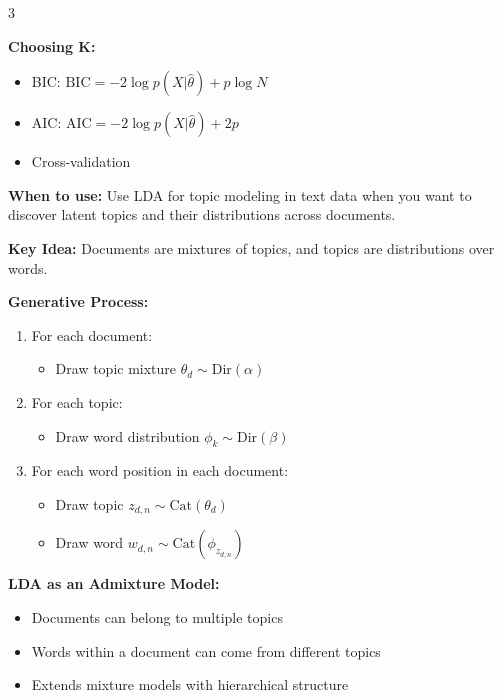 \documentclass[10pt,landscape]{article}
\begin{document}
\begin{multicols}{3}
\begin{tcolorbox}[breakable, title=6.2 Gaussian Mixture Models (GMM), colback=mixture,boxsep=1pt,left=1pt,right=1pt,top=1pt,bottom=1pt]
\textbf{Choosing K:}
\begin{itemize}[leftmargin=*,noitemsep,topsep=0pt]
    \item BIC: $\text{BIC} = -2\log p(X|\hat{\theta}) + p\log N$
    \item AIC: $\text{AIC} = -2\log p(X|\hat{\theta}) + 2p$
    \item Cross-validation
\end{itemize}
\end{tcolorbox}

\begin{tcolorbox}[breakable, title=6.3 Latent Dirichlet Allocation (LDA), colback=mixture,boxsep=1pt,left=1pt,right=1pt,top=1pt,bottom=1pt]
\textbf{When to use:} Use LDA for topic modeling in text data when you want to discover latent topics and their distributions across documents.

\textbf{Key Idea:} Documents are mixtures of topics, and topics are distributions over words.

\textbf{Generative Process:}
\begin{enumerate}[leftmargin=*,noitemsep,topsep=0pt]
    \item For each document:
    \begin{itemize}[leftmargin=*,noitemsep]
        \item Draw topic mixture $\theta_d \sim \text{Dir}(\alpha)$
    \end{itemize}
    \item For each topic:
    \begin{itemize}[leftmargin=*,noitemsep]
        \item Draw word distribution $\phi_k \sim \text{Dir}(\beta)$
    \end{itemize}
    \item For each word position in each document:
    \begin{itemize}[leftmargin=*,noitemsep]
        \item Draw topic $z_{d,n} \sim \text{Cat}(\theta_d)$
        \item Draw word $w_{d,n} \sim \text{Cat}(\phi_{z_{d,n}})$
    \end{itemize}
\end{enumerate}

\textbf{LDA as an Admixture Model:}
\begin{itemize}[leftmargin=*,noitemsep,topsep=0pt]
    \item Documents can belong to multiple topics
    \item Words within a document can come from different topics
    \item Extends mixture models with hierarchical structure
\end{itemize}


\end{tcolorbox}
\end{multicols}
\end{document}
